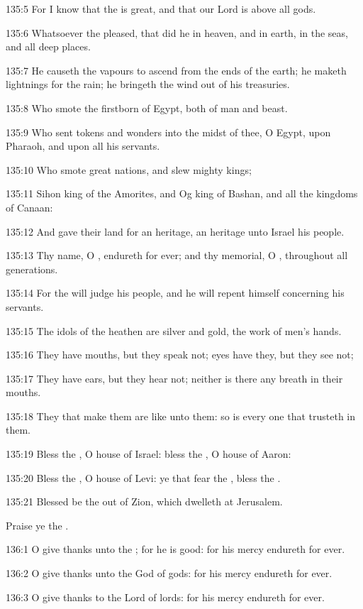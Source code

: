 135:5 For I know that the \LORD is great, and that our Lord is above all gods.

135:6 Whatsoever the \LORD pleased, that did he in heaven, and in earth, in the seas, and all deep places.

135:7 He causeth the vapours to ascend from the ends of the earth; he maketh lightnings for the rain; he bringeth the wind out of his treasuries.

135:8 Who smote the firstborn of Egypt, both of man and beast.

135:9 Who sent tokens and wonders into the midst of thee, O Egypt, upon Pharaoh, and upon all his servants.

135:10 Who smote great nations, and slew mighty kings;

135:11 Sihon king of the Amorites, and Og king of Bashan, and all the kingdoms of Canaan:

135:12 And gave their land for an heritage, an heritage unto Israel his people.

135:13 Thy name, O \LORD, endureth for ever; and thy memorial, O \LORD, throughout all generations.

135:14 For the \LORD will judge his people, and he will repent himself concerning his servants.

135:15 The idols of the heathen are silver and gold, the work of men's hands.

135:16 They have mouths, but they speak not; eyes have they, but they see not;

135:17 They have ears, but they hear not; neither is there any breath in their mouths.

135:18 They that make them are like unto them: so is every one that trusteth in them.

135:19 Bless the \LORD, O house of Israel: bless the \LORD, O house of Aaron:

135:20 Bless the \LORD, O house of Levi: ye that fear the \LORD, bless the \LORD.

135:21 Blessed be the \LORD out of Zion, which dwelleth at Jerusalem.

Praise ye the \LORD.



136:1 O give thanks unto the \LORD; for he is good: for his mercy endureth for ever.

136:2 O give thanks unto the God of gods: for his mercy endureth for ever.

136:3 O give thanks to the Lord of lords: for his mercy endureth for ever.

